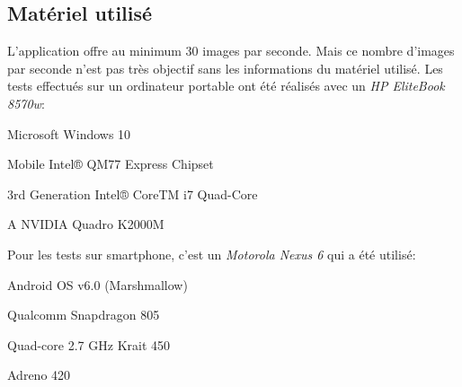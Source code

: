 \subsection{Matériel utilisé}
L'application offre au minimum 30 images par seconde. Mais ce nombre d'images par seconde n'est pas très objectif sans les informations du matériel utilisé. Les tests effectués sur un ordinateur portable ont été réalisés avec un \emph{HP EliteBook 8570w}:

\begin{description}[align=right, labelwidth=3cm]
	\item [OS] Microsoft Windows 10
	\item [Chipset]	Mobile Intel® QM77 Express Chipset
	\item [CPU] 3rd Generation Intel® CoreTM i7 Quad-Core
	\item [GPU] A NVIDIA Quadro K2000M
\end{description}

Pour les tests sur smartphone, c'est un \emph{Motorola Nexus 6} qui a été utilisé:

\begin{description}[align=right, labelwidth=3cm]
	\item [OS] 	Android OS v6.0 (Marshmallow)
	\item [Chipset]	Qualcomm Snapdragon 805
	\item [CPU] Quad-core 2.7 GHz Krait 450
	\item [GPU] Adreno 420
\end{description}
